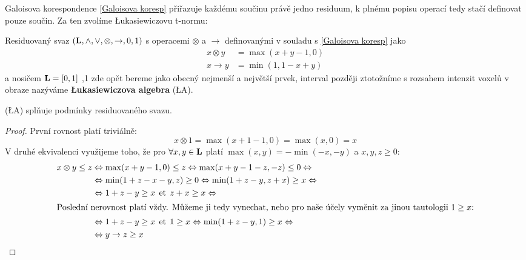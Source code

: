     Galoisova korespondence \eqref{Galoisova koresp} přiřazuje každému součinu právě jedno residuum, k plnému popisu operací tedy stačí definovat pouze součin. Za ten zvolíme \L ukasiewiczovu t-normu:

    \begin{define}\label{LA}
    Residuovaný svaz $(\mathbf{L},\wedge,\vee,\otimes,\rightarrow,0,1)$ s operacemi $\otimes$ a $\rightarrow$ definovanými v souladu s \eqref{Galoisova koresp} jako
    \begin{align}
    x \otimes y &= \max(x+y-1,0) \\
    x \rightarrow y &= \min(1,1-x+y)
    \end{align}
    a nosičem $\mathbf{L} = [0,1]$ ,1 zde opět bereme jako obecný nejmenší a největší prvek, interval později ztotožníme s rozsahem intenzit voxelů v obraze\rr {} nazýváme \textbf{\L ukasiewiczova algebra} \textup{(\L A)}.
    \end{define}

    \begin{theo}
      \textup{(\L A)} splňuje podmínky residuovaného svazu.
    \end{theo}
    \begin{proof}
    První rovnost platí triviálně:
      \[
      x \otimes 1 = \max(x+1-1,0) = \max(x,0) = x
      \]
    V druhé ekvivalenci využijeme toho, že pro $\forall x,y \in \mathbf{L}$ platí $\max(x,y) = -\min(-x,-y)$ a $x,y,z \geq 0$:
    \begin{align*}
      x \otimes y \leq z &\Leftrightarrow \max(x+y-1,0) \leq z \Leftrightarrow \max(x+y-1-z,-z) \leq 0 \Leftrightarrow\\
      &\Leftrightarrow \min(1+z-x-y,z) \geq 0 \Leftrightarrow \min(1+z-y,z+x) \geq x \Leftrightarrow\\
      &\Leftrightarrow 1+z-y \geq x \;\,\mathrm{et}\;\, z+x \geq x \Leftrightarrow\\
    \intertext{Poslední nerovnost platí vždy. Můžeme ji tedy vynechat, nebo pro naše účely vyměnit za jinou tautologii $1 \geq x$:}
      &\Leftrightarrow 1+z-y \geq x \;\,\mathrm{et}\;\, 1 \geq x \Leftrightarrow \min(1+z-y,1) \geq x \Leftrightarrow\\
      &\Leftrightarrow y \rightarrow z \geq x
    \end{align*}
    \end{proof}


